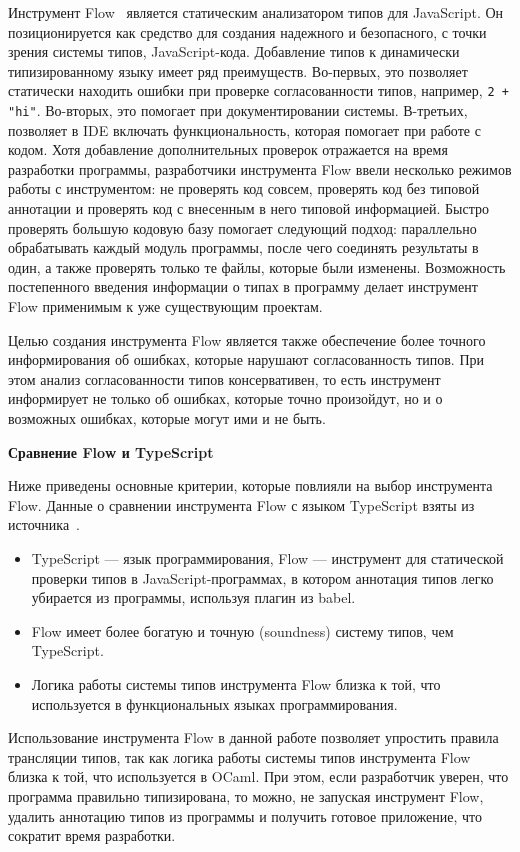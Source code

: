 Инструмент Flow~\cite{flow} является статическим анализатором типов для JavaScript. Он позиционируется как средство для создания надежного и безопасного, с точки зрения системы типов, JavaScript-кода. Добавление типов к динамически типизированному языку имеет ряд преимуществ. Во-первых, это позволяет статически находить ошибки при проверке согласованности типов, например, \verb|2 + "hi"|. Во-вторых, это помогает при документировании системы. В-третьих, позволяет в IDE включать функциональность, которая помогает при работе с кодом. Хотя добавление дополнительных проверок отражается на время разработки программы, разработчики инструмента Flow ввели несколько режимов работы с инструментом: не проверять код совсем, проверять код без типовой аннотации и проверять код с внесенным в него типовой информацией. Быстро проверять большую кодовую базу помогает следующий подход: параллельно обрабатывать каждый модуль программы, после чего соединять результаты в один, а также проверять только те файлы, которые были изменены. Возможность постепенного введения информации о типах в программу делает инструмент Flow применимым к уже существующим проектам.

Целью создания инструмента Flow является также обеспечение более точного информирования об ошибках, которые нарушают согласованность типов. При этом анализ согласованности типов консервативен, то есть инструмент информирует не только об ошибках, которые точно произойдут, но и о возможных ошибках, которые могут ими и не быть. 

\textbf{Сравнение Flow и TypeScript}

Ниже приведены основные критерии, которые повлияли на выбор инструмента Flow. Данные о сравнении инструмента Flow с языком TypeScript взяты из источника~\cite{flowts}.

\begin{itemize}
    \item TypeScript --- язык программирования, Flow --- инструмент для статической проверки типов в JavaScript-программах, в котором аннотация типов легко убирается из программы, используя плагин из babel.
    \item Flow имеет более богатую и точную (soundness) систему типов, чем TypeScript.
    \item Логика работы системы типов инструмента Flow близка к той, что используется в функциональных языках программирования.
\end{itemize}

Использование инструмента Flow в данной работе позволяет упростить правила трансляции типов, так как логика работы системы типов инструмента Flow близка к той, что используется в OCaml. При этом, если разработчик уверен, что программа правильно типизирована, то можно, не запуская инструмент Flow, удалить аннотацию типов из программы и получить готовое приложение, что сократит время разработки.

